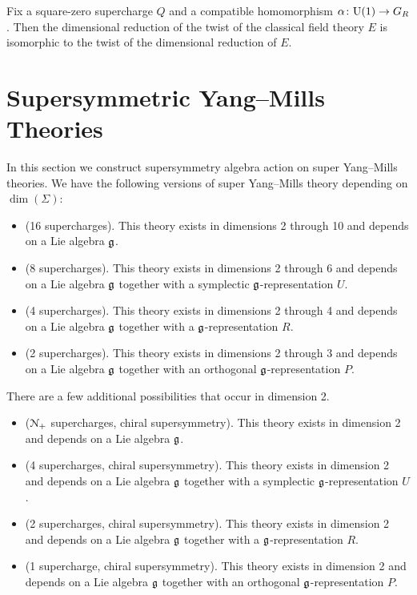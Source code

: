 \documentclass[10pt, oneside]{article}
\begin{document}
\begin{prop}
Fix a square-zero supercharge $Q$ and a compatible homomorphism $\alpha\colon \mathrm{U}(1)\rightarrow G_R$. Then the dimensional reduction of the twist of the classical field theory $E$ is isomorphic to the twist of the dimensional reduction of $E$.
\label{prop:twistdimensionalreduction}
\end{prop}

\section{Supersymmetric Yang--Mills Theories} \label{sect:SYM}

In this section we construct supersymmetry algebra action on super Yang--Mills theories. We have the following versions of super Yang--Mills theory depending on $\dim(\Sigma)$:
\begin{itemize}
\item (16 supercharges). This theory exists in dimensions 2 through 10 and depends on a Lie algebra $\mathfrak g$.

\item (8 supercharges). This theory exists in dimensions 2 through 6 and depends on a Lie algebra $\mathfrak g$ together with a symplectic $\mathfrak g$-representation $U$.

\item (4 supercharges). This theory exists in dimensions 2 through 4 and depends on a Lie algebra $\mathfrak g$ together with a $\mathfrak g$-representation $R$.

\item (2 supercharges). This theory exists in dimensions 2 through 3 and depends on a Lie algebra $\mathfrak g$ together with an orthogonal $\mathfrak g$-representation $P$.
\end{itemize}

There are a few additional possibilities that occur in dimension 2.

\begin{itemize}
\item ($\mathcal N_+$ supercharges, chiral supersymmetry). This theory exists in dimension 2 and depends on a Lie algebra $\mathfrak g$.

\item (4 supercharges, chiral supersymmetry). This theory exists in dimension 2 and depends on a Lie algebra $\mathfrak g$ together with a symplectic $\mathfrak g$-representation $U$.

\item (2 supercharges, chiral supersymmetry). This theory exists in dimension 2 and depends on a Lie algebra $\mathfrak g$ together with a $\mathfrak g$-representation $R$.

\item (1 supercharge, chiral supersymmetry). This theory exists in dimension 2 and depends on a Lie algebra $\mathfrak g$ together with an orthogonal $\mathfrak g$-representation $P$.
\end{itemize}
\end{document}
